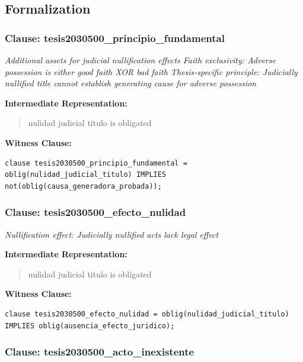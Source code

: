 \documentclass[11pt,a4paper]{article}
\begin{document}
\subsection{Formalization}

\subsubsection{Clause: tesis2030500\_principio\_fundamental}

\textit{Additional assets for judicial nullification effects Faith exclusivity: Adverse possession is either good faith XOR bad faith Thesis-specific principle: Judicially nullified title cannot establish generating cause for adverse possession}

\textbf{Intermediate Representation:}

\begin{quote}
nulidad judicial titulo is obligated
\end{quote}

\textbf{Witness Clause:}

\begin{lstlisting}[style=witnessstyle, language=Witness]
clause tesis2030500_principio_fundamental = oblig(nulidad_judicial_titulo) IMPLIES not(oblig(causa_generadora_probada));
\end{lstlisting}

\subsubsection{Clause: tesis2030500\_efecto\_nulidad}

\textit{Nullification effect: Judicially nullified acts lack legal effect}

\textbf{Intermediate Representation:}

\begin{quote}
nulidad judicial titulo is obligated
\end{quote}

\textbf{Witness Clause:}

\begin{lstlisting}[style=witnessstyle, language=Witness]
clause tesis2030500_efecto_nulidad = oblig(nulidad_judicial_titulo) IMPLIES oblig(ausencia_efecto_juridico);
\end{lstlisting}

\subsubsection{Clause: tesis2030500\_acto\_inexistente}
\end{document}
